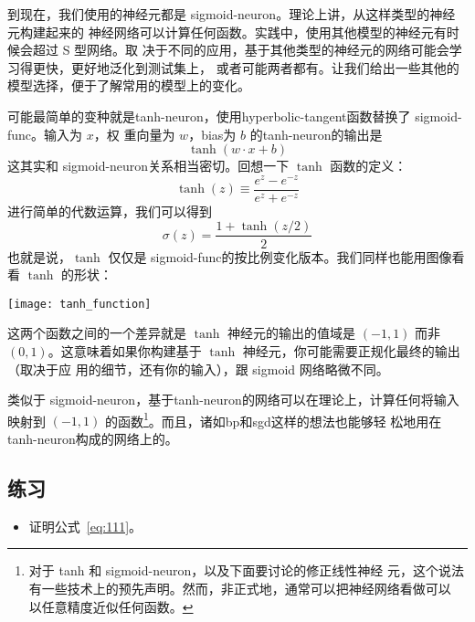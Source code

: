 到现在，我们使用的神经元都是 \gls*{sigmoid-neuron}。理论上讲，从这样类型的神经元构建起来的
神经网络可以计算任何函数。实践中，使用其他模型的神经元有时候会超过 S 型网络。取
决于不同的应用，基于其他类型的神经元的网络可能会学习得更快，更好地泛化到测试集上，
或者可能两者都有。让我们给出一些其他的模型选择，便于了解常用的模型上的变化。

可能最简单的变种就是\gls{tanh-neuron}，使用\gls{hyperbolic-tangent}函数替换了 \gls*{sigmoid-func}。输入为 $x$，权
重向量为 $w$，\gls*{bias}为 $b$ 的\gls*{tanh-neuron}的输出是
\begin{equation}
  \tanh(w \cdot x+b)
  \label{eq:109}\tag{109}
\end{equation}
这其实和 \gls*{sigmoid-neuron}关系相当密切。回想一下 $\tanh$ 函数的定义：
\begin{equation}
  \tanh(z) \equiv \frac{e^z-e^{-z}}{e^z+e^{-z}}
  \label{eq:110}\tag{110}
\end{equation}
进行简单的代数运算，我们可以得到
\begin{equation} 
  \sigma(z) = \frac{1+\tanh(z/2)}{2}
  \label{eq:111}\tag{111}
\end{equation}
也就是说，$\tanh$ 仅仅是 \gls*{sigmoid-func}的按比例变化版本。我们同样也能用图像看看
$\tanh$ 的形状：
\begin{center}
  \texttt{[image: tanh\_function]}
\end{center}

这两个函数之间的一个差异就是 $\tanh$ 神经元的输出的值域是 $(-1, 1)$ 而非 $(0,
1)$。这意味着如果你构建基于 $\tanh$ 神经元，你可能需要正规化最终的输出（取决于应
  用的细节，还有你的输入），跟 sigmoid 网络略微不同。

类似于 \gls*{sigmoid-neuron}，基于\gls*{tanh-neuron}的网络可以在理论上，计算任何将输入映射到
$(-1, 1)$ 的函数\footnote{对于 tanh 和 \gls*{sigmoid-neuron}，以及下面要讨论的修正线性神经
  元，这个说法有一些技术上的预先声明。然而，非正式地，通常可以把神经网络看做可以
  以任意精度近似任何函数。}。而且，诸如\gls*{bp}和\gls*{sgd}这样的想法也能够轻
松地用在\gls*{tanh-neuron}构成的网络上的。

\subsection*{练习}

\begin{itemize}
\item 证明公式~\eqref{eq:111}。
\end{itemize}

